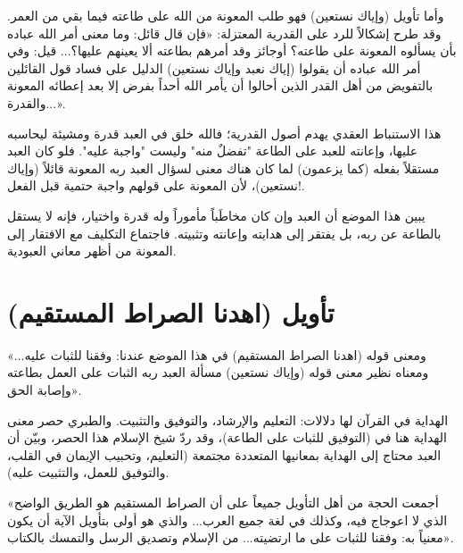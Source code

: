 وأما تأويل (وإياك نستعين) فهو طلب المعونة من الله على طاعته فيما بقي من العمر. وقد طرح  إشكالاً للرد على القدرية المعتزلة:
 «فإن قال قائل: وما معنى أمر الله عباده بأن يسألوه المعونة على طاعته؟ أوجائز وقد أمرهم بطاعته ألا يعينهم عليها؟... قيل: وفي أمر الله عباده أن يقولوا (إياك نعبد وإياك نستعين) الدليل على فساد قول القائلين بالتفويض من أهل القدر الذين أحالوا أن يأمر الله أحداً بفرض إلا بعد إعطائه المعونة والقدرة...».

\begin{fawaid}
هذا الاستنباط العقدي يهدم أصول القدرية؛ فالله خلق في العبد قدرة ومشيئة ليحاسبه عليها، وإعانته للعبد على الطاعة "تفضلٌ منه" وليست "واجبة عليه". فلو كان العبد مستقلاً بفعله (كما يزعمون) لما كان هناك معنى لسؤال العبد ربه المعونة قائلاً (وإياك نستعين)، لأن المعونة على قولهم واجبة حتمية قبل الفعل!.
\end{fawaid}

\begin{fawaid}
يبين هذا الموضع أن العبد وإن كان مخاطَباً مأموراً وله قدرة واختيار، فإنه لا يستقل بالطاعة عن ربه، بل يفتقر إلى هدايته وإعانته وتثبيته. فاجتماع التكليف مع الافتقار إلى المعونة من أظهر معاني العبودية.
\end{fawaid}

\separator

\section{تأويل (اهدنا الصراط المستقيم)}
 «ومعنى قوله (اهدنا الصراط المستقيم) في هذا الموضع عندنا: وفقنا للثبات عليه... ومعناه نظير معنى قوله (وإياك نستعين) مسألة العبد ربه الثبات على العمل بطاعته وإصابة الحق».

\begin{fawaid}
الهداية في القرآن لها دلالات: التعليم والإرشاد، والتوفيق والتثبيت. والطبري حصر معنى الهداية هنا في (التوفيق للثبات على الطاعة)، وقد ردّ شيخ الإسلام  هذا الحصر، وبيّن أن العبد محتاج إلى الهداية بمعانيها المتعددة مجتمعة (التعليم، وتحبيب الإيمان في القلب، والتوفيق للعمل، والتثبيت عليه).
\end{fawaid}

 «أجمعت الحجة من أهل التأويل جميعاً على أن الصراط المستقيم هو الطريق الواضح الذي لا اعوجاج فيه، وكذلك في لغة جميع العرب... والذي هو أولى بتأويل الآية أن يكون معنياً به: وفقنا للثبات على ما ارتضيته... من الإسلام وتصديق الرسل والتمسك بالكتاب».


